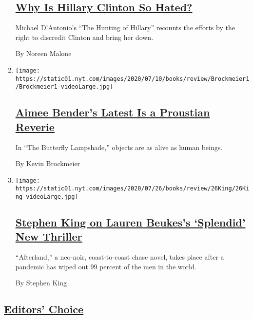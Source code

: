 \begin{enumerate}
  \hypertarget{why-is-hillary-clinton-so-hated}{%
  \subsection{\texorpdfstring{\href{/2020/07/28/books/review/the-hunting-of-hillary-michael-dantonio.html}{Why
  Is Hillary Clinton So
  Hated?}}{Why Is Hillary Clinton So Hated?}}\label{why-is-hillary-clinton-so-hated}}

  Michael D'Antonio's ``The Hunting of Hillary'' recounts the efforts by
  the right to discredit Clinton and bring her down.

  By Noreen Malone
\item
  \texttt{[image: https://static01.nyt.com/images/2020/07/10/books/review/Brockmeier1/Brockmeier1-videoLarge.jpg]}

  \hypertarget{aimee-benders-latest-is-a-proustian-reverie}{%
  \subsection{\texorpdfstring{\href{/2020/07/28/books/review/aimee-bender-the-butterfly-lampshade.html}{Aimee
  Bender's Latest Is a Proustian
  Reverie}}{Aimee Bender's Latest Is a Proustian Reverie}}\label{aimee-benders-latest-is-a-proustian-reverie}}

  In ``The Butterfly Lampshade,'' objects are as alive as human beings.

  By Kevin Brockmeier
\item
  \texttt{[image: https://static01.nyt.com/images/2020/07/26/books/review/26King/26King-videoLarge.jpg]}

  \hypertarget{stephen-king-on-lauren-beukess-splendid-new-thriller}{%
  \subsection{\texorpdfstring{\href{/2020/07/24/books/review/lauren-beukes-afterland.html}{Stephen
  King on Lauren Beukes's `Splendid' New
  Thriller}}{Stephen King on Lauren Beukes's `Splendid' New Thriller}}\label{stephen-king-on-lauren-beukess-splendid-new-thriller}}

  ``Afterland,'' a neo-noir, coast-to-coast chase novel, takes place
  after a pandemic has wiped out 99 percent of the men in the world.

  By Stephen King
\end{enumerate}

\hypertarget{editors-choice}{%
\subsection{\texorpdfstring{\href{/column/new-books}{Editors'
Choice}}{Editors' Choice}}\label{editors-choice}}

